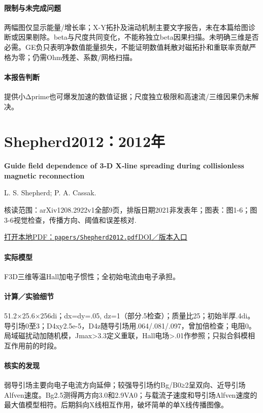 \paragraph{限制与未完成问题}两幅图仅显示能量/增长率；X-Y拓扑及湍动机制主要文字报告，未在本篇给图诊断或因果剔除。beta与尺度共同变化，不能称独立beta因果扫描。未明确三维是否必需。GE负只表明净数值能量损失，不能证明数值耗散对磁拓扑和重联率贡献严格为零；仍需Ohm残差、系数/网格扫描。

\paragraph{本报告判断}提供小Δprime也可爆发加速的数值证据；尺度独立极限和高速流/三维因果仍未解决。

\section{Shepherd2012：2012年}\label{paper:Shepherd2012}

\textbf{Guide field dependence of 3‐D X‐line spreading during collisionless magnetic reconnection}\citep{Shepherd2012}\

L. S. Shepherd;  P. A. Cassak.

\textsf{核读范围：}arXiv1208.2922v1全部9页，排版日期2021非发表年；\textsf{图表：}图1-6；图3-6视觉检查，传播方向、阈值和误差核对.

\href{run:papers/Shepherd2012.pdf}{打开本地PDF：\texttt{papers/Shepherd2012.pdf}}\quad\href{https://doi.org/10.1029/2012ja017867}{DOI／版本入口}

\paragraph{实际模型}F3D三维等温Hall加电子惯性；全初始电流由电子承担。

\paragraph{计算／实验细节}51.2×25.6×256di；dx=dy=.05, dz=1（部分.5检查）；质量比25；初始半厚.4di。导引场0至3；D4xy2.5e-5，D4z随导引场用.064/.081/.097，曾加倍检查；电阻0。局域磁扰动加随机模，Jmax>3.3定义重联，Hall电场>.01作参照；只拟合斜模相互作用前的时段。

\paragraph{核实的发现}弱导引场主要向电子电流方向延伸；较强导引场约Bg/B0≥2呈双向、近导引场Alfven速度。Bg2.5测得两方向3.0和2.9VA0；与载流子速度和导引场Alfven速度的最大值模型相符。后期斜向X线相互作用，破坏简单的单X线传播图像。

